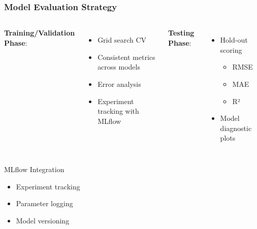 \documentclass{beamer}
\begin{document}
\begin{frame}
\frametitle{Model Evaluation Strategy}
    \begin{columns}
        \textbf{Training/Validation Phase}:
            \begin{itemize}
            \item Grid search CV
            \item Consistent metrics across models
            \item Error analysis
            \item Experiment tracking with MLflow
            \end{itemize}
            
        \textbf{Testing Phase}:
            \begin{itemize}
            \item Hold-out scoring
                \begin{itemize}
                \item RMSE
                \item MAE
                \item R²
                \end{itemize}
            \item Model diagnostic plots
            \end{itemize}
    \end{columns}

    \begin{alertblock}{MLflow Integration}
        \begin{itemize}
        \item Experiment tracking
        \item Parameter logging
        \item Model versioning
        \end{itemize}
    \end{alertblock}
\end{frame}
\end{document}
